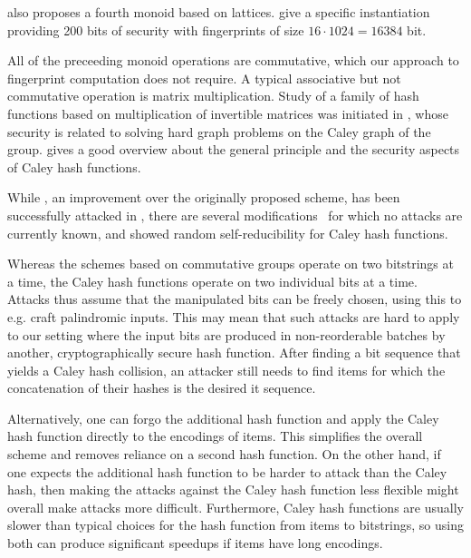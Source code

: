 \cite{bellare1997new} also proposes a fourth monoid based on lattices. \cite{lewi2019securing} give a specific instantiation providing 200 bits of security with fingerprints of size $16 \cdot 1024 = 16384$ bit.

All of the preceeding monoid operations are commutative, which our approach to fingerprint computation does not require. A typical associative but not commutative operation is matrix multiplication. Study of a family of hash functions based on multiplication of invertible matrices was initiated in \cite{zemor1991hash}, whose security is related to solving hard graph problems on the Caley graph of the group. \cite{petit2011rubik} gives a good overview about the general principle and the security aspects of Caley hash functions.

While \cite{tillich1994hashing}, an improvement over the originally proposed scheme, has been successfully attacked in \cite{grassl2011cryptanalysis}\cite{petit2010preimages}, there are several modifications~\cite{petit2009graph}\cite{bromberg2017navigating}\cite{sosnovski2016cayley} for which no attacks are currently known, and \cite{mullan2016text} showed random self-reducibility for Caley hash functions.

Whereas the schemes based on commutative groups operate on two bitstrings at a time, the Caley hash functions operate on two individual bits at a time. Attacks thus assume that the manipulated bits can be freely chosen, using this to e.g. craft palindromic inputs. This may mean that such attacks are hard to apply to our setting where the input bits are produced in non-reorderable batches by another, cryptographically secure hash function. After finding a bit sequence that yields a Caley hash collision, an attacker still needs to find items for which the concatenation of their hashes is the desired it sequence.

Alternatively, one can forgo the additional hash function and apply the Caley hash function directly to the encodings of items. This simplifies the overall scheme and removes reliance on a second hash function. On the other hand, if one expects the additional hash function to be harder to attack than the Caley hash, then making the attacks against the Caley hash function less flexible might overall make attacks more difficult. Furthermore, Caley hash functions are usually slower than typical choices for the hash function from items to bitstrings, so using both can produce significant speedups if items have long encodings.

